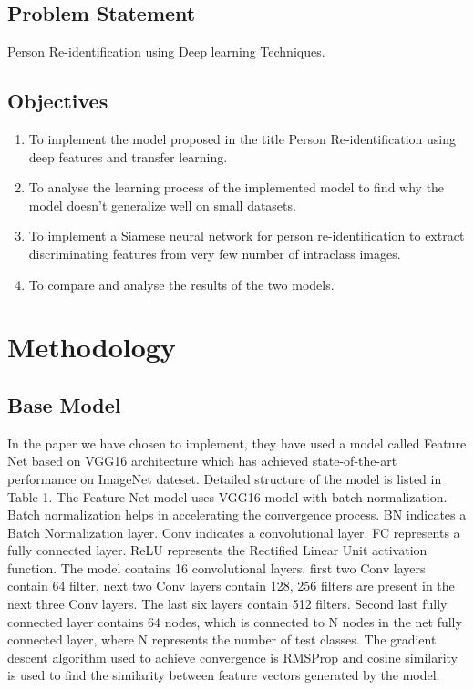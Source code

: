 \documentclass{article}[12pt,a4paper]
\begin{document}
\subsection{Problem Statement}
Person Re-identification using Deep learning Techniques.
\subsection{Objectives}
\begin{enumerate}
    \item To implement the model proposed in the title Person Re-identification using deep features and transfer learning.
    \item To analyse the learning process of the implemented model to find why the model doesn't generalize well on small datasets.
    \item To implement a Siamese neural network for person re-identification to extract discriminating features from very few number of intraclass images.
    \item To compare and analyse the results of the two models.
\end{enumerate}
\newpage
\section{Methodology}
\subsection{Base Model}
In the paper\cite{base_paper} we have chosen to implement, they have used a model called Feature Net based on VGG16 architecture which has achieved state-of-the-art performance on ImageNet dateset. Detailed structure of the model is listed in Table 1. The Feature Net model uses VGG16 model with batch normalization.  Batch normalization helps in accelerating the convergence process. BN indicates a Batch Normalization layer. Conv indicates a convolutional layer. FC represents a fully connected layer. ReLU represents the Rectified Linear Unit activation function. The model contains 16 convolutional layers. first two Conv layers contain 64 filter, next two Conv layers contain 128, 256 filters are present in the next three Conv layers.  The last six layers contain 512 filters. Second last fully connected layer contains 64 nodes, which is connected to N nodes in the net fully connected layer, where N represents the number of test classes. The gradient descent algorithm used to achieve convergence is RMSProp and cosine similarity is used to find the similarity between feature vectors generated by the model.
\vfill
\end{document}

